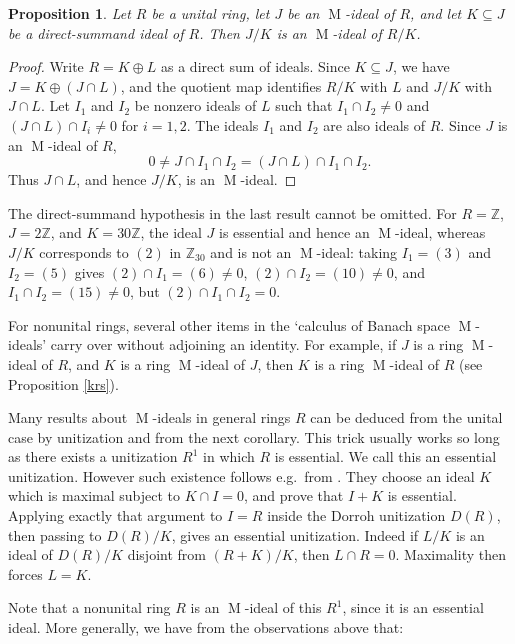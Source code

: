 \documentclass[11pt,leqno]{amsart}
\DeclareMathOperator{\m}{M}
\newtheorem{proposition}[theorem]{Proposition}
\theoremstyle{definition}
\theoremstyle{remark}
\numberwithin{equation}{section}
\numberwithin{equation}{section}
\begin{document}
\begin{proposition}\label{jk}
Let $R$ be a unital ring, let $J$ be an $\m$-ideal of $R$, and let $K\subseteq J$ be a direct-summand ideal of $R$. Then $J/K$ is an $\m$-ideal of $R/K$. 
\end{proposition}
	
\begin{proof}
Write $R=K\oplus L$ as a direct sum of ideals. Since $K\subseteq J$, we have $J=K\oplus(J\cap L)$, and the quotient map identifies $R/K$ with $L$ and $J/K$ with $J\cap L$. Let $I_1$ and $I_2$ be nonzero ideals of $L$ such that $I_1\cap I_2\neq 0$ and $(J\cap L)\cap I_i\neq 0$ for $i=1,2$. The ideals $I_1$ and $I_2$ are also ideals of $R$. Since $J$ is an $\m$-ideal of $R$,
\[
0\neq J\cap I_1\cap I_2=(J\cap L)\cap I_1\cap I_2.
\]
Thus $J\cap L$, and hence $J/K$, is an $\m$-ideal.
\end{proof}

The direct-summand hypothesis in the last result cannot be omitted. For $R=\mathds{Z}$, $J=2\mathds{Z}$, and $K=30\mathds{Z}$, the ideal $J$ is essential and hence an $\m$-ideal, whereas $J/K$ corresponds to $(2)$ in $\mathds{Z}_{30}$ and is not an $\m$-ideal: taking $I_1=(3)$ and $I_2=(5)$ gives $(2)\cap I_1=(6)\neq 0$, $(2)\cap I_2=(10)\neq 0$, and $I_1\cap I_2=(15)\neq 0$, but $(2)\cap I_1\cap I_2=0$.

For nonunital rings, several other items in the `calculus of Banach space $\m$-ideals' carry over without adjoining an identity.   For example, 
if $J$ is a ring $\m$-ideal of $R$, and $K$ is a ring $\m$-ideal of $J$, then
$K$ is a ring $\m$-ideal of $R$ (see Proposition \ref{krs}).

Many results about $\m$-ideals in general rings $R$ can be deduced from the unital case by unitization and from the next corollary.  This trick usually works so long
as there exists  a unitization $R^1$ in which $R$ is essential. We call this an essential unitization.  However such existence follows e.g.\ from \cite[Lemma 1]{OJ81}. They choose an ideal $K$ which is maximal subject to $K\cap I=0$, and prove that $I+K$ is essential. Applying exactly that argument to $I=R$ inside the Dorroh unitization $D(R)$, then passing to $D(R)/K$, gives an essential unitization.  Indeed  if $L/K$ is an ideal of $D(R)/K$ disjoint from  $(R+K)/K$, then $L\cap R=0$.  Maximality then forces $L=K$.

Note that a nonunital ring $R$ is an $\m$-ideal of this $R^{1}$, since it is
an essential ideal. More generally, we have from the observations above
that:
\end{document}
